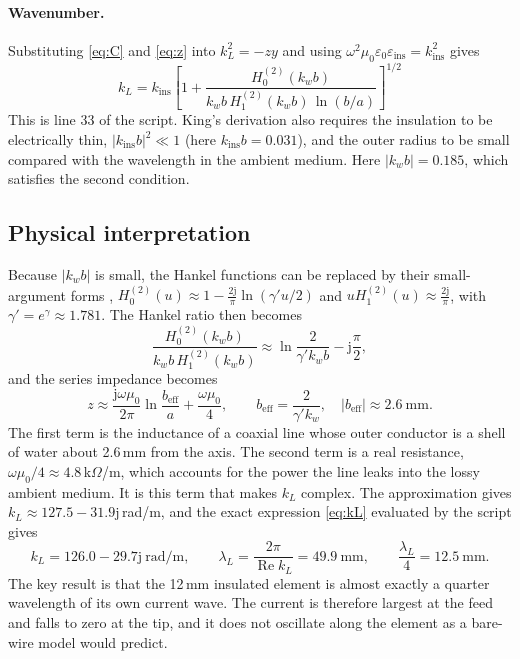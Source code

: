 \documentclass[11pt,a4paper]{article}
\newcommand{\eps}{\varepsilon}
\newcommand{\jj}{\mathrm{j}}
\begin{document}
\paragraph{Wavenumber.} Substituting \eqref{eq:C} and \eqref{eq:z} into $k_L^2=-zy$ and using
$\omega^2\mu_0\eps_0\eps_{\text{ins}}=k_{\text{ins}}^2$ gives
\begin{equation}
  \boxed{\,k_L = k_{\text{ins}}\left[1 + \frac{H^{(2)}_0(k_w b)}{k_w b\,H^{(2)}_1(k_w b)\,\ln(b/a)}\right]^{1/2}\,}
  \label{eq:kL}
\end{equation}
This is line 33 of the script. King's derivation also requires the insulation to be electrically thin,
$|k_{\text{ins}}b|^2\ll1$ (here $k_{\text{ins}}b=0.031$), and the outer radius to be small compared with the
wavelength in the ambient medium. Here $|k_w b|=0.185$, which satisfies the second condition.

\subsection{Physical interpretation}

Because $|k_wb|$ is small, the Hankel functions can be replaced by their small-argument forms
\cite{AbramowitzStegun1964}, $H^{(2)}_0(u)\approx1-\tfrac{2\jj}{\pi}\ln(\gamma' u/2)$ and
$uH^{(2)}_1(u)\approx \tfrac{2\jj}{\pi}$, with $\gamma'=e^{\gamma}\approx1.781$. The Hankel ratio then becomes
\begin{equation}
  \frac{H^{(2)}_0(k_w b)}{k_w b\,H^{(2)}_1(k_w b)} \approx \ln\frac{2}{\gamma' k_w b} - \jj\frac{\pi}{2},
\end{equation}
and the series impedance becomes
\begin{equation}
  z \approx \frac{\jj\omega\mu_0}{2\pi}\ln\frac{b_{\text{eff}}}{a} + \frac{\omega\mu_0}{4},
  \qquad b_{\text{eff}} = \frac{2}{\gamma' k_w},\quad |b_{\text{eff}}| \approx 2.6\ \text{mm}.
\end{equation}
The first term is the inductance of a coaxial line whose outer conductor is a shell of water about 2.6\,mm
from the axis. The second term is a real resistance, $\omega\mu_0/4\approx4.8$\,k$\Omega$/m, which accounts for
the power the line leaks into the lossy ambient medium. It is this term that makes $k_L$ complex. The
approximation gives $k_L\approx127.5-31.9\jj$\,rad/m, and the exact expression \eqref{eq:kL} evaluated by
the script gives
\begin{equation}
  k_L = 126.0 - 29.7\jj\ \text{rad/m},\qquad
  \lambda_L = \frac{2\pi}{\operatorname{Re}k_L} = 49.9\ \text{mm},\qquad
  \frac{\lambda_L}{4} = 12.5\ \text{mm}.
\end{equation}
The key result is that the 12\,mm insulated element is almost exactly a quarter wavelength of its own
current wave. The current is therefore largest at the feed and falls to zero at the tip, and it does not
oscillate along the element as a bare-wire model would predict.
\end{document}
